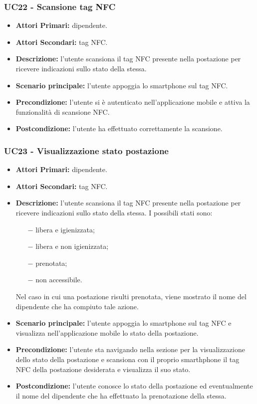 \subsubsection{ UC22 - Scansione tag NFC}
\begin{itemize}
	\item\textbf{Attori Primari:} dipendente.
	\item\textbf{Attori Secondari:} tag NFC.
	\item\textbf{Descrizione:} l’utente scansiona il tag NFC presente nella postazione per ricevere indicazioni sullo stato della stessa.
	\item\textbf{Scenario principale:} l’utente appoggia lo smartphone sul tag NFC.
	\item\textbf{Precondizione:} l’utente si è autenticato nell'applicazione mobile e attiva la funzionalità di scansione NFC.
	\item\textbf{Postcondizione:} l’utente ha effettuato correttamente la scansione.
\end{itemize}

\subsubsection{ UC23 - Visualizzazione stato postazione}
\begin{itemize}
	\item\textbf{Attori Primari:} dipendente.
	\item\textbf{Attori Secondari:} tag NFC.
	\item\textbf{Descrizione:} l’utente scansiona il tag NFC presente nella postazione per ricevere indicazioni sullo stato della stessa. I possibili stati sono:
	\begin{itemize}
		\item[$-$]libera e igienizzata;
		\item[$-$]libera e non igienizzata;
		\item[$-$]prenotata;
		\item[$-$]non accessibile.
	\end{itemize}
	Nel caso in cui una postazione risulti prenotata, viene mostrato il nome del dipendente che ha compiuto tale azione.
	\item\textbf{Scenario principale:} l’utente appoggia lo smartphone sul tag NFC e visualizza nell'applicazione mobile lo stato della postazione. 
	\item\textbf{Precondizione:} l’utente sta navigando nella sezione per la visualizzazione dello stato della postazione e 
	scansiona con il proprio smarthphone il tag NFC della postazione desiderata e visualizza il suo stato.
	\item\textbf{Postcondizione:} l’utente conosce lo stato della postazione ed eventualmente il nome del dipendente che ha effettuato la prenotazione della stessa.
\end{itemize}

